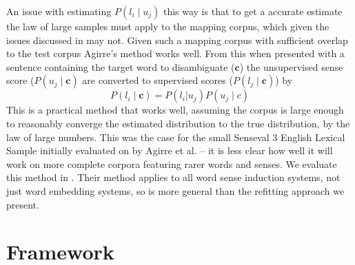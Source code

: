 \documentclass{sig-alternate}
\renewcommand{\c}{\mathbf{c}}
\begin{document}
An issue with estimating $P(l_i \mid u_j)$ this way is that to get a accurate estimate the law of large samples must apply to the mapping corpus, which given the issues discussed in  may not. Given such a mapping corpus with sufficient overlap to the test corpus Agirre's method works well.
From this  when presented with a sentence containing the target word to disambiguate ($\c$) the unsupervised sense score ($P(u_j \mid \c)$ are converted to supervised scores ($P(l_j \mid \c)$) by
\begin{equation} \label{eq:agireewsd}
P(l_i \mid \c) = P(l_i | u_j) P(u_j \mid c)
\end{equation}
This is a practical method that works well, assuming the corpus is large enough to reasonably converge the estimated distribution to the true distribution, by the law of large numbers. This was the case for the small Senseval 3 English Lexical Sample \parencite{mihalcea2004senseval} initially evaluated on by Agirre et al. -- it is less clear how well it will work on more complete corpora featuring rarer words and senses.
We evaluate this method in .
Their method applies to all word sense induction systems, not just word embedding systems, so is more general than the refitting approach we present.



\section{Framework} \label{Frameword}
\end{document}
